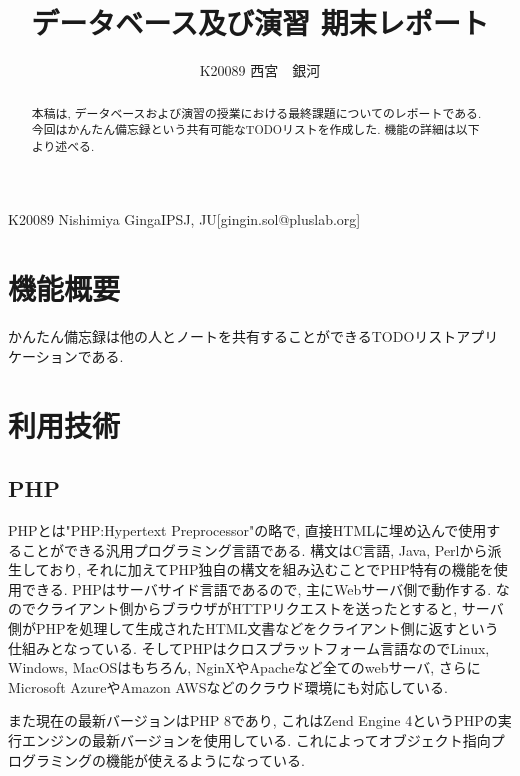 \documentclass[submit,techrep]{ipsj}
\begin{document}

\title{データベース及び演習 期末レポート\\}

\author{K20089 西宮　銀河}{K20089 Nishimiya Ginga}{IPSJ, JU}[gingin.sol@pluslab.org]

\begin{abstract}
本稿は, データベースおよび演習の授業における最終課題についてのレポートである. 
今回はかんたん備忘録という共有可能なTODOリストを作成した. 機能の詳細は以下より述べる.
\end{abstract}

\maketitle

\section{機能概要}
かんたん備忘録は他の人とノートを共有することができるTODOリストアプリケーションである. 

\section{利用技術}

\subsection{PHP}
PHPとは"PHP:Hypertext Preprocessor"の略で, 直接HTMLに埋め込んで使用することができる汎用プログラミング言語である. 
構文はC言語, Java, Perlから派生しており, それに加えてPHP独自の構文を組み込むことでPHP特有の機能を使用できる. 
PHPはサーバサイド言語であるので, 主にWebサーバ側で動作する. 
なのでクライアント側からブラウザがHTTPリクエストを送ったとすると, サーバ側がPHPを処理して生成されたHTML文書などをクライアント側に返すという仕組みとなっている. 
そしてPHPはクロスプラットフォーム言語なのでLinux, Windows, MacOSはもちろん, NginXやApacheなど全てのwebサーバ, さらにMicrosoft AzureやAmazon AWSなどのクラウド環境にも対応している. 

また現在の最新バージョンはPHP 8であり, これはZend Engine 4というPHPの実行エンジンの最新バージョンを使用している. これによってオブジェクト指向プログラミングの機能が使えるようになっている. 
\end{document}
